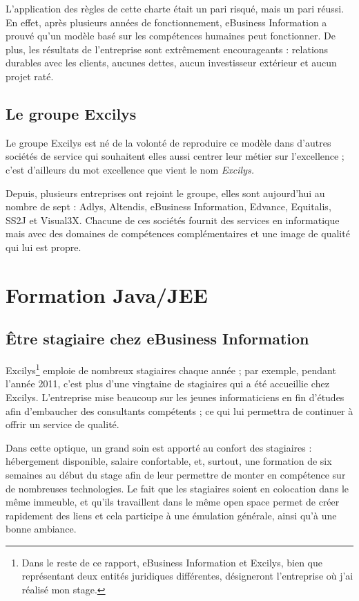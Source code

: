 L'application des règles de cette charte était un pari risqué, mais un pari réussi. En effet, après plusieurs années de fonctionnement, eBusiness Information a prouvé qu'un modèle basé sur les compétences humaines peut fonctionner. De plus, les résultats de l'entreprise sont extrêmement encourageants : relations durables avec les clients, aucunes dettes, aucun investisseur extérieur et aucun projet raté.

\subsection{Le groupe Excilys}
Le groupe Excilys est né de la volonté de reproduire ce modèle dans d'autres sociétés de service qui souhaitent elles aussi centrer leur métier sur l'excellence ; c'est d'ailleurs du mot excellence que vient le nom \em{Excilys}.

Depuis, plusieurs entreprises ont rejoint le groupe, elles sont aujourd'hui au nombre de sept : Adlys, Altendis, eBusiness Information, Edvance, Equitalis, SS2J et Visual3X. Chacune de ces sociétés fournit des services en informatique mais avec des domaines de compétences complémentaires et une image de qualité qui lui est propre.
  
\section{Formation Java/JEE}

\subsection{Être stagiaire chez eBusiness Information}

Excilys\footnote{Dans le reste de ce rapport, eBusiness Information et Excilys, bien que représentant deux entités juridiques différentes, désigneront l'entreprise où j'ai réalisé mon stage.} emploie de nombreux stagiaires chaque année ; par exemple, pendant l'année 2011, c'est plus d'une vingtaine de stagiaires qui a été accueillie chez Excilys. L'entreprise mise beaucoup sur les jeunes informaticiens en fin d'études afin d'embaucher des consultants compétents ; ce qui lui permettra de continuer à offrir un service de qualité.

Dans cette optique, un grand soin est apporté au confort des stagiaires : hébergement disponible, salaire confortable, et, surtout, une formation de six semaines au début du stage afin de leur permettre de monter en compétence sur de nombreuses technologies. Le fait que les stagiaires soient en colocation dans le même immeuble, et qu'ils travaillent dans le même open space permet de créer rapidement des liens et cela participe à une émulation générale, ainsi qu'à une bonne ambiance.

